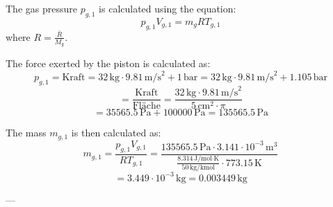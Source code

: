 The gas pressure \( p_{g,1} \) is calculated using the equation:  
\[
p_{g,1} V_{g,1} = m_g R T_{g,1}
\]  
where \( R = \frac{\bar{R}}{M_g} \).  

The force exerted by the piston is calculated as:  
\[
p_{g,1} = \text{Kraft} = 32 \, \text{kg} \cdot 9.81 \, \text{m/s}^2 + 1 \, \text{bar} = 32 \, \text{kg} \cdot 9.81 \, \text{m/s}^2 + 1.105 \, \text{bar}
\]  
\[
= \frac{\text{Kraft}}{\text{Fläche}} = \frac{32 \, \text{kg} \cdot 9.81 \, \text{m/s}^2}{5 \, \text{cm}^2 \cdot \pi}
\]  
\[
= 35565.5 \, \text{Pa} + 100000 \, \text{Pa} = 135565.5 \, \text{Pa}
\]  

The mass \( m_{g,1} \) is then calculated as:  
\[
m_{g,1} = \frac{p_{g,1} V_{g,1}}{R T_{g,1}} = \frac{135565.5 \, \text{Pa} \cdot 3.141 \cdot 10^{-3} \, \text{m}^3}{\frac{8.314 \, \text{J/mol·K}}{50 \, \text{kg/kmol}} \cdot 773.15 \, \text{K}}
\]  
\[
= 3.449 \cdot 10^{-3} \, \text{kg} = 0.003449 \, \text{kg}
\]  

---